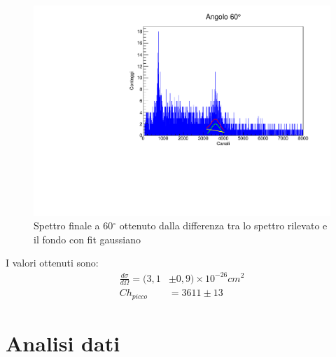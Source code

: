 \documentclass[italian,11pt]{report}
\begin{document}
\begin{figure}[!htp]
\centering
\includegraphics[width=12cm]{60finale.pdf}
\caption{Spettro finale a 60$^\circ$ ottenuto dalla differenza tra lo spettro rilevato e il fondo con fit gaussiano}
\end{figure}

\vspace{5cm}
I valori ottenuti sono:
\begin{align*}
\frac{d\sigma}{d\Omega} =(3,1&\pm0,9)\times10^{-26} cm^2 \\
Ch_{picco}&=3611\pm13
\end{align*}


\newpage
\section {Analisi dati}
\end{document}
